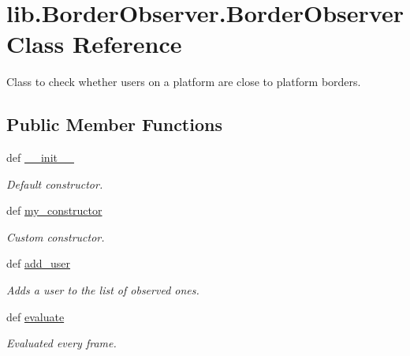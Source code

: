 \hypertarget{classlib_1_1BorderObserver_1_1BorderObserver}{\section{lib.\-Border\-Observer.\-Border\-Observer \-Class \-Reference}
\label{classlib_1_1BorderObserver_1_1BorderObserver}
}


\-Class to check whether users on a platform are close to platform borders.  


\subsection*{\-Public \-Member \-Functions}
\begin{DoxyCompactItemize}
\item 
def \hyperlink{classlib_1_1BorderObserver_1_1BorderObserver_af17370c6f789ae77072169736f7a5db8}{\-\_\-\-\_\-init\-\_\-\-\_\-}
\begin{DoxyCompactList}\small\item\em \-Default constructor. \end{DoxyCompactList}\item 
def \hyperlink{classlib_1_1BorderObserver_1_1BorderObserver_a0c8a0a4d64b15ae66bb84879ee5d44a6}{my\-\_\-constructor}
\begin{DoxyCompactList}\small\item\em \-Custom constructor. \end{DoxyCompactList}\item 
def \hyperlink{classlib_1_1BorderObserver_1_1BorderObserver_a8c8681cf716d688fe782efcec21aff26}{add\-\_\-user}
\begin{DoxyCompactList}\small\item\em \-Adds a user to the list of observed ones. \end{DoxyCompactList}\item 
def \hyperlink{classlib_1_1BorderObserver_1_1BorderObserver_af972bcaea2599f0598384a1b7f7c359d}{evaluate}
\begin{DoxyCompactList}\small\item\em \-Evaluated every frame. \end{DoxyCompactList}\end{DoxyCompactItemize}
